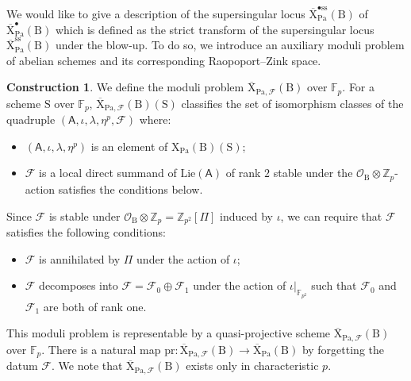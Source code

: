 \documentclass[10pt]{amsart}
\numberwithin{equation}{section}
\theoremstyle{definition}
\newtheorem{construction}[equation]{Construction}
\def\Pa{\mathrm{Pa}}
\def\calF{\mathcal{F}}
\def\calO{\mathcal{O}}
\def\FF{\mathbb{F}}
\def\ZZ{\mathbb{Z}}
\def\sfA{\mathsf{A}}
\def\rmB{\mathrm{B}}
\def\rmS{\mathrm{S}}
\def\rmX{\mathrm{X}}
\begin{document}
We would like to give a description of the supersingular locus $\overline{\rmX}^{\bullet\mathrm{ss}}_{\Pa}(\rmB)$ of $\overline{\rmX}^{\bullet}_{\Pa}(\rmB)$ which is defined as the strict transform of the supersingular locus $\overline{\rmX}^{\mathrm{ss}}_{\Pa}(\rmB)$ under the blow-up. To do so, we introduce an auxiliary moduli problem of abelian schemes and its corresponding Raopoport--Zink space.

\begin{construction}
We define the moduli problem $\overline{\rmX}_{\Pa, \calF}(\rmB)$ over $\FF_{p}$. For a scheme $\rmS$ over $\FF_{p}$, $\overline{\rmX}_{\Pa,\calF}(\rmB)(\rmS)$ classifies the set of isomorphism classes of the quadruple $(\sfA, \iota , \lambda, \eta^{p}, \calF)$ where:
\begin{itemize}
\item $(\sfA, \iota , \lambda, \eta^{p})$ is an element of $\rmX_{\Pa}(\rmB)(\rmS)$;
\item $\calF$ is a local direct summand of $\mathrm{Lie}(\mathsf{A})$ of rank $2$ stable under the $\calO_{\rmB}\otimes\ZZ_{p}$-action satisfies the conditions below.
\end{itemize}
Since $\calF$ is stable under $\calO_{\rmB}\otimes\ZZ_{p}=\ZZ_{p^{2}}[\Pi]$ induced by $\iota$, we can require that $\calF$ satisfies the following conditions: 
\begin{itemize}
\item $\calF$ is annihilated by $\Pi$ under the action of $\iota$;
\item $\calF$ decomposes into $\calF=\calF_{0}\oplus \calF_{1}$ under the action of $\iota\vert_{\FF_{p^{2}}}$ such that $\calF_{0}$ and $\calF_{1}$ are both of rank one.
\end{itemize}
\end{construction}

This moduli problem is representable by a quasi-projective scheme $\overline{\rmX}_{\Pa,\calF}(\rmB)$ over $\FF_{p}$. There is a natural map $\mathrm{pr}:\overline{\rmX}_{\Pa,\calF}(\rmB)\rightarrow \overline{\rmX}_{\Pa}(\rmB)$ by forgetting the datum $\calF$. We note that $\overline{\rmX}_{\Pa,\calF}(\rmB)$ exists only in characteristic $p$. 
\end{document}
